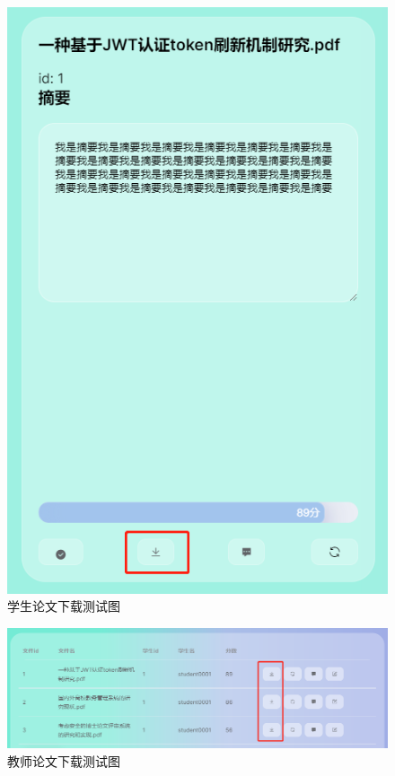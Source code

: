 \begin{figure}[htbp]
  \centering
  \includegraphics[scale = 0.6]{out/figure/测试/download-student-test.png}
  \caption{\song\wuhao 学生论文下载测试图}
  \label{download-student-test}
\end{figure}

\begin{figure}[htbp]
  \centering
  \includegraphics[scale = 0.6]{out/figure/测试/download-teacher-test.png}
  \caption{\song\wuhao 教师论文下载测试图}
  \label{download-teacher-test}
\end{figure}

